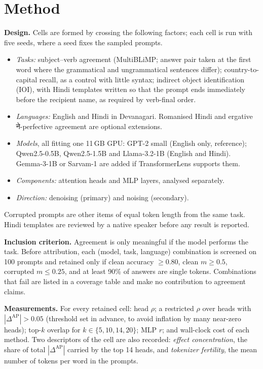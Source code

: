 \documentclass[10pt,a4paper]{article}
\newcommand{\hi}[1]{{\hindifont #1}}
\begin{document}
\section{Method}
\textbf{Design.} Cells are formed by crossing the following factors; each cell is run with five seeds, where a seed fixes the sampled prompts.
\begin{itemize}
  \item \emph{Tasks:} subject--verb agreement (MultiBLiMP; answer pair taken at the first word where the grammatical and ungrammatical sentences differ); country-to-capital recall, as a control with little syntax; indirect object identification (IOI), with Hindi templates written so that the prompt ends immediately before the recipient name, as required by verb-final order.
  \item \emph{Languages:} English and Hindi in Devanagari. Romanised Hindi and ergative \hi{ने}-perfective agreement are optional extensions.
  \item \emph{Models}, all fitting one 11\,GB GPU: GPT-2 small (English only, reference); Qwen2.5-0.5B, Qwen2.5-1.5B and Llama-3.2-1B (English and Hindi). Gemma-3-1B or Sarvam-1 are added if TransformerLens supports them.
  \item \emph{Components:} attention heads and MLP layers, analysed separately.
  \item \emph{Direction:} denoising (primary) and noising (secondary).
\end{itemize}
Corrupted prompts are other items of equal token length from the same task. Hindi templates are reviewed by a native speaker before any result is reported.

\textbf{Inclusion criterion.} Agreement is only meaningful if the model performs the task. Before attribution, each (model, task, language) combination is screened on 100 prompts and retained only if clean accuracy $\ge 0.80$, clean $m \ge 0.5$, corrupted $m \le 0.25$, and at least 90\% of answers are single tokens. Combinations that fail are listed in a coverage table and make no contribution to agreement claims.

\textbf{Measurements.} For every retained cell: head $\rho$; a restricted $\rho$ over heads with $|\Delta^{\mathrm{AP}}| > 0.05$ (threshold set in advance, to avoid inflation by many near-zero heads); top-$k$ overlap for $k \in \{5, 10, 14, 20\}$; MLP $r$; and wall-clock cost of each method. Two descriptors of the cell are also recorded: \emph{effect concentration}, the share of total $|\Delta^{\mathrm{AP}}|$ carried by the top 14 heads, and \emph{tokenizer fertility}, the mean number of tokens per word in the prompts.
\end{document}
